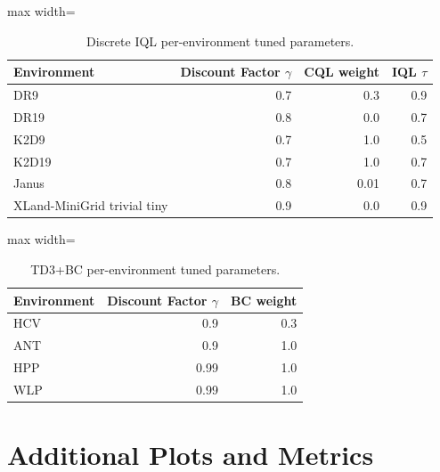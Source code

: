 \documentclass{article}
\begin{document}
\begin{table}[ht]
    \label{tab:dr9_stats}
    \begin{center}
    \caption{Discrete IQL per-environment tuned parameters.}
    \begin{small}
    \begin{adjustbox}{max width=\columnwidth}
		\begin{tabular}{l|rrr}
		\toprule
	\textbf{Environment} & \textbf{Discount Factor $\gamma$} & \textbf{CQL weight} & \textbf{IQL $\tau$}\\
\midrule
DR9 & 0.7 & 0.3 & 0.9\\
DR19 & 0.8 & 0.0 & 0.7\\
K2D9 & 0.7 & 1.0 & 0.5\\
K2D19 & 0.7 & 1.0 & 0.7\\
Janus & 0.8 & 0.01 & 0.7\\
XLand-MiniGrid trivial tiny & 0.9 & 0.0 & 0.9 \\
\bottomrule
\end{tabular}
        \end{adjustbox}
        \end{small}
    \end{center}
    \vskip -0.1in
\end{table}
\begin{table}[ht]
    \label{tab:}
    \begin{center}
 \caption{TD3+BC per-environment tuned parameters.}
    \begin{small}
    \begin{adjustbox}{max width=\columnwidth}
		\begin{tabular}{l|rr}
		\toprule
	\textbf{Environment} & \textbf{Discount Factor $\gamma$} & \textbf{BC weight} \\
\midrule
HCV & 0.9 & 0.3 \\
ANT & 0.9 & 1.0 \\
HPP & 0.99 & 1.0 \\
WLP & 0.99 & 1.0 \\
\bottomrule
\end{tabular}
        \end{adjustbox}
    \end{small}
    \end{center}
    \vskip -0.1in
\end{table}
\FloatBarrier
\section{Additional Plots and Metrics}
\label{app:additional_plots_metrics}
\end{document}
